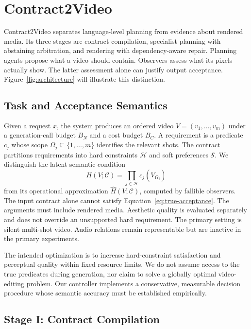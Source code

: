 \section{Contract2Video}
\label{sec:method}

Contract2Video separates language-level planning from evidence about rendered
media. Its three stages are contract compilation, specialist planning with
abstaining arbitration, and rendering with dependency-aware repair. Planning
agents propose what a video should contain. Observers assess what its pixels
actually show. The latter assessment alone can justify output acceptance.
Figure~\ref{fig:architecture} will illustrate this distinction.

\subsection{Task and Acceptance Semantics}
\label{sec:task}

Given a request $x$, the system produces an ordered video
$V=(v_1,\ldots,v_m)$ under a generation-call budget $B_N$ and a cost budget
$B_C$. A requirement is a predicate $c_j$ whose scope
$\Omega_j\subseteq\{1,\ldots,m\}$ identifies the relevant shots.
The contract partitions requirements into hard constraints $\mathcal H$ and
soft preferences $\mathcal S$. We distinguish the latent semantic condition
\begin{equation}
 H(V;\mathcal C)=\prod_{j\in\mathcal H}c_j(V_{\Omega_j})
 \label{eq:true-acceptance}
\end{equation}
from its operational approximation $\widehat H(V;\mathcal C)$, computed by
fallible observers. The input contract alone cannot satisfy
Equation~\ref{eq:true-acceptance}. The arguments must include rendered media.
Aesthetic quality is evaluated separately and does not override an unsupported
hard requirement. The primary setting is silent multi-shot video. Audio
relations remain representable but are inactive in the primary experiments.

The intended optimization is to increase hard-constraint satisfaction and
perceptual quality within fixed resource limits. We do not assume access to
the true predicates during generation, nor claim to solve a globally optimal
video-editing problem. Our controller implements a conservative, measurable
decision procedure whose semantic accuracy must be established empirically.

\subsection{Stage I: Contract Compilation}
\label{sec:contract}

